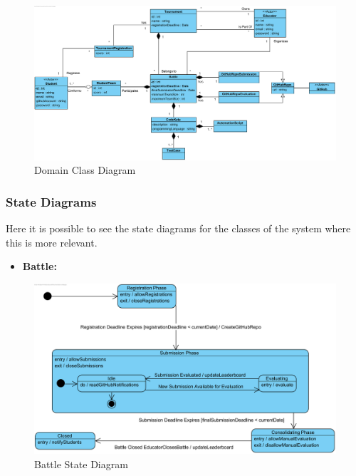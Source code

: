\documentclass{article}
\begin{document}
\newpage
\begin{figure}[h]
    \centering
    \includegraphics[width=1\textwidth]{images/DomainClassDiagram.png}
    \caption{Domain Class Diagram}
    \label{fig:DomainClassDiagram}
\end{figure}

\subsubsection{State Diagrams}

Here it is possible to see the state diagrams for the classes of the system where this is more relevant.
\begin{itemize}
    \item \textbf{Battle:}
\end{itemize}

\begin{figure}[!h]
    \centering
    \includegraphics[width=1\textwidth]{images/BattleStateDiagram.png}
    \caption{Battle State Diagram}
    \label{fig:BattleStateDiagram}
\end{figure}
\end{document}
